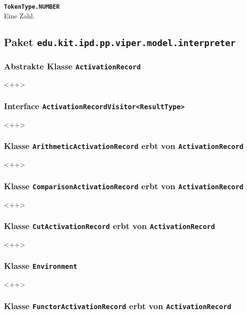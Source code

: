 \documentclass[parskip=full,11pt,twoside]{scrartcl}
\begin{document}
\textbf{\texttt{TokenType.NUMBER}}\\
Eine Zahl.

\subsection{Paket \texttt{edu.kit.ipd.pp.viper.model.interpreter}}

\subsubsection{Abstrakte Klasse \texttt{ActivationRecord}}

<++>

\subsubsection{Interface \texttt{ActivationRecordVisitor<ResultType>}}

<++>

\subsubsection{Klasse \texttt{ArithmeticActivationRecord} erbt von \texttt{ActivationRecord}}

<++>

\subsubsection{Klasse \texttt{ComparisonActivationRecord} erbt von \texttt{ActivationRecord}}

<++>

\subsubsection{Klasse \texttt{CutActivationRecord} erbt von \texttt{ActivationRecord}}

<++>

\subsubsection{Klasse \texttt{Environment}}

<++>

\subsubsection{Klasse \texttt{FunctorActivationRecord} erbt von \texttt{ActivationRecord}}
\end{document}
